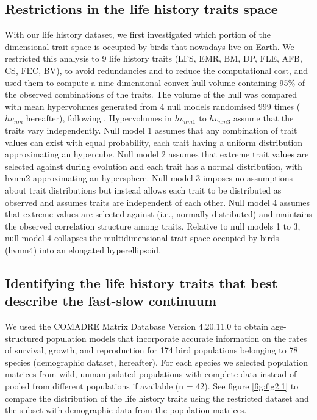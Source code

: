 \subsection*{Restrictions in the life history traits space}

With our life history dataset, we first investigated which portion of the 
dimensional trait space is occupied by birds that nowadays live on Earth. We 
restricted this analysis to 9 life history traits (LFS, EMR, BM, DP, FLE, 
AFB, CS, FEC, BV), to avoid redundancies and to reduce the computational cost, 
and used them to compute a nine-dimensional convex hull volume containing 95\% 
of the observed combinations of the traits. The volume of the hull 
was compared with mean hypervolumes generated from 4 null models randomised 
999 times ($hv_{nm}$ hereafter), following \citet{Diaz2016}⁠. 
Hypervolumes in $hv_{nm1}$ to $hv_{nm3}$ assume that the traits vary 
independently. Null model 1 assumes that any combination of trait values can 
exist with equal probability, each trait having a uniform distribution 
approximating an hypercube. Null model 2 assumes that extreme trait values are 
selected against during evolution and each trait has a normal distribution, 
with hvnm2 approximating an hypersphere. Null model 3 imposes no assumptions 
about trait distributions but instead allows each trait to be distributed as 
observed and assumes traits are independent of each other. Null model 4 assumes 
that extreme values are selected against (i.e., normally distributed) and 
maintains the observed correlation structure among traits. Relative to null 
models 1 to 3, null model 4 collapses the multidimensional trait-space occupied 
by birds (hvnm4) into an elongated hyperellipsoid.


\subsection*{Identifying the life history traits that best describe the 
fast-slow continuum}

We used the COMADRE Matrix Database Version 4.20.11.0 
\citep{Salguero-Gomez2016} to obtain age-structured population models that 
incorporate accurate information on the rates of survival, growth, and 
reproduction for 174 bird populations belonging to 78 species (demographic 
dataset, hereafter). For each species we selected population matrices from 
wild, unmanipulated populations with complete data instead of pooled from 
different populations if available (n = 42). See figure \ref{fig:fig2.1} to 
compare the distribution of the life history traits using the restricted 
dataset and the subset with demographic data from the population matrices.

